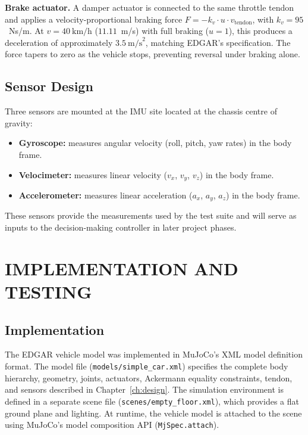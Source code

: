 \documentclass[a4paper,12pt]{report}
\begin{document}
\textbf{Brake actuator.} A damper actuator is connected to the same throttle
tendon and applies a velocity-proportional braking force
$F = -k_v \cdot u \cdot v_{\text{tendon}}$, with $k_v = 95$~Ns/m. At
$v = 40\ \text{km/h}$ ($11.11$~m/s) with full braking ($u = 1$), this
produces a deceleration of approximately $3.5\ \text{m/s}^2$, matching
EDGAR's specification. The force tapers to zero as the vehicle stops,
preventing reversal under braking alone.

\section{Sensor Design}

Three sensors are mounted at the IMU site located at the chassis centre of
gravity:

\begin{itemize}
  \item \textbf{Gyroscope:} measures angular velocity (roll, pitch, yaw rates)
        in the body frame.
  \item \textbf{Velocimeter:} measures linear velocity ($v_x$, $v_y$, $v_z$)
        in the body frame.
  \item \textbf{Accelerometer:} measures linear acceleration ($a_x$, $a_y$,
        $a_z$) in the body frame.
\end{itemize}

These sensors provide the measurements used by the test suite and will serve
as inputs to the decision-making controller in later project phases.

\chapter{IMPLEMENTATION AND TESTING}

\section{Implementation}

The EDGAR vehicle model was implemented in MuJoCo's XML model definition format.
The model file (\texttt{models/simple\_car.xml}) specifies the complete body
hierarchy, geometry, joints, actuators, Ackermann equality constraints, tendon,
and sensors described in Chapter~\ref{ch:design}. The simulation environment is
defined in a separate scene file (\texttt{scenes/empty\_floor.xml}), which
provides a flat ground plane and lighting. At runtime, the vehicle model is
attached to the scene using MuJoCo's model composition API
(\texttt{MjSpec.attach}).
\end{document}
